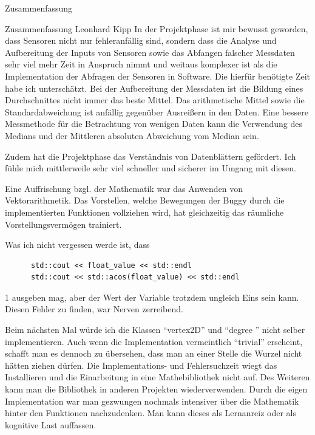 \documentclass[12pt]{report}
\begin{document}
\begin{section}{Zusammenfassung}
  \begin{subsection}{Zusammenfassung Leonhard Kipp}
    In der Projektphase ist mir bewusst geworden, dass Sensoren nicht nur
    fehleranfällig sind, sondern dass die Analyse und Aufbereitung der Inputs
    von Sensoren sowie das Abfangen falscher Messdaten sehr viel mehr Zeit in Anspruch nimmt und weitaus komplexer
    ist als die Implementation der Abfragen der Sensoren in Software. Die
    hierfür benötigte Zeit habe ich unterschätzt.
    Bei der Aufbereitung der Messdaten ist die Bildung eines Durchschnittes nicht
    immer das beste Mittel. Das arithmetische Mittel sowie die
    Standardabweichung ist anfällig gegenüber Ausreißern
    in den Daten. Eine bessere Messmethode für die Betrachtung von wenigen Daten
    kann die Verwendung des Medians und der Mittleren absoluten Abweichung vom
    Median sein.

    Zudem hat die Projektphase das Verständnis von Datenblättern gefördert. Ich
    fühle mich mittlerweile sehr viel schneller und sicherer im Umgang mit diesen.

    Eine Auffrischung bzgl. der Mathematik war das Anwenden von Vektorarithmetik. Das Vorstellen,
    welche Bewegungen der Buggy durch die implementierten Funktionen vollziehen
    wird, hat gleichzeitig das räumliche Vorstellungsvermögen trainiert.

    Was ich nicht vergessen werde ist, dass
    \begin{lstlisting}
      std::cout << float_value << std::endl
      std::cout << std::acos(float_value) << std::endl
    \end{lstlisting}
    1 ausgeben mag, aber der Wert der Variable trotzdem ungleich Eins sein kann.
    Diesen Fehler zu finden, war Nerven zerreibend.

    Beim nächsten Mal würde ich die Klassen ``vertex2D'' und ``degree '' nicht
    selber implementieren. Auch wenn die Implementation vermeintlich ``trivial''
    erscheint, schafft man es dennoch zu übersehen, dass man an einer Stelle die
    Wurzel nicht hätten ziehen dürfen. Die Implementations- und Fehlersuchzeit
    wiegt das Installieren und die Einarbeitung in eine Mathebibliothek nicht
    auf. Des Weiteren kann man die Bibliothek in anderen Projekten
    wiederverwenden.
    Durch die eigen Implementation war man gezwungen nochmals
    intensiver über die Mathematik hinter den Funktionen nachzudenken. Man kann
    dieses als Lernanreiz oder als kognitive Last auffassen.


\end{subsection}
\end{section}
\end{document}
